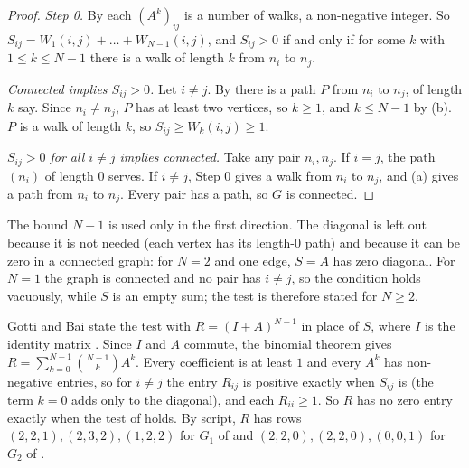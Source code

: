 \begin{proof}
\emph{Step 0.} By  each $(A^k)_{ij}$ is a number of walks, a non-negative integer. So $S_{ij} = W_1(i,j) + \dots + W_{N-1}(i,j)$, and $S_{ij} > 0$ if and only if for some $k$ with $1 \le k \le N-1$ there is a walk of length $k$ from $n_i$ to $n_j$.

\emph{Connected implies $S_{ij} > 0$.} Let $i \ne j$. By  there is a path $P$ from $n_i$ to $n_j$, of length $k$ say. Since $n_i \ne n_j$, $P$ has at least two vertices, so $k \ge 1$, and $k \le N - 1$ by (b). $P$ is a walk of length $k$, so $S_{ij} \ge W_k(i,j) \ge 1$.

\emph{$S_{ij} > 0$ for all $i \ne j$ implies connected.} Take any pair $n_i, n_j$. If $i = j$, the path $(n_i)$ of length $0$ serves. If $i \ne j$, Step 0 gives a walk from $n_i$ to $n_j$, and (a) gives a path from $n_i$ to $n_j$. Every pair has a path, so $G$ is connected.
\end{proof}

The bound $N-1$ is used only in the first direction. The diagonal is left out because it is not needed (each vertex has its length-$0$ path) and because it can be zero in a connected graph: for $N = 2$ and one edge, $S = A$ has zero diagonal. For $N = 1$ the graph is connected and no pair has $i \ne j$, so the condition holds vacuously, while $S$ is an empty sum; the test is therefore stated for $N \ge 2$.

\begin{remark}\label{rem:binom}
Gotti and Bai state the test with $R = (I + A)^{N-1}$ in place of $S$, where $I$ is the identity matrix \cite[Proposition 3, p.~2]{gotti_18211_lecture27} \cite[Theorem 2, p.~1]{bai_bimsa_adjacency}. Since $I$ and $A$ commute, the binomial theorem gives $R = \sum_{k=0}^{N-1} \binom{N-1}{k} A^k$. Every coefficient is at least $1$ and every $A^k$ has non-negative entries, so for $i \ne j$ the entry $R_{ij}$ is positive exactly when $S_{ij}$ is (the term $k = 0$ adds only to the diagonal), and each $R_{ii} \ge 1$. So $R$ has no zero entry exactly when the test of  holds. By script, $R$ has rows $(2,2,1), (2,3,2), (1,2,2)$ for $G_1$ of  and $(2,2,0), (2,2,0), (0,0,1)$ for $G_2$ of .
\end{remark}
